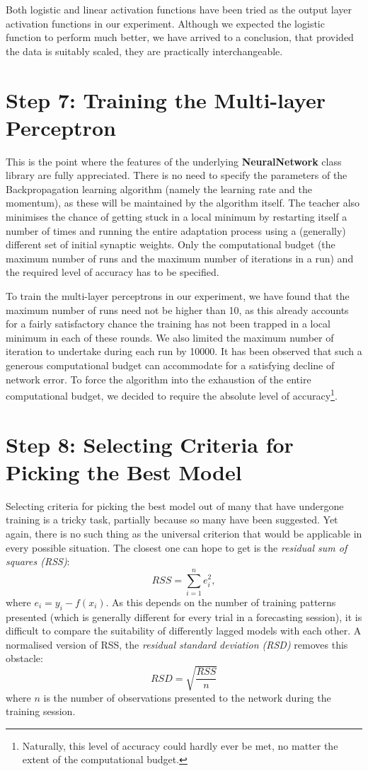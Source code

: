 \smallskip

Both logistic and linear activation functions have been tried as the output layer activation functions in our experiment. Although we expected the logistic function to perform much better, we have arrived to a conclusion, that provided the data is suitably scaled, they are practically interchangeable.

\section{Step 7: Training the Multi-layer Perceptron}

This is the point where the features of the underlying \textbf{NeuralNetwork} class library are fully appreciated. There is no need to specify the parameters of the Backpropagation learning algorithm (namely the learning rate and the momentum), as these will be maintained by the algorithm itself. The teacher also minimises the chance of getting stuck in a local minimum by restarting itself a number of times and running the entire adaptation process using a (generally) different set of initial synaptic weights. Only the computational budget (the maximum number of runs and the maximum number of iterations in a run) and the required level of accuracy has to be specified.

\smallskip

To train the multi-layer perceptrons in our experiment, we have found that the maximum number of runs need not be higher than 10, as this already accounts for a fairly satisfactory chance the training has not been trapped in a local minimum in each of these rounds. We also limited the maximum number of iteration to undertake during each run by 10000. It has been observed that such a generous computational budget can accommodate for a satisfying decline of network error. To force the algorithm into the exhaustion of the entire computational budget, we decided to require the absolute level of accuracy\footnote{Naturally, this level of accuracy could hardly ever be met, no matter the extent of the computational budget.}.

\section{Step 8: Selecting Criteria for Picking the Best Model}

Selecting criteria for picking the best model out of many that have undergone training is a tricky task, partially because so many have been suggested. Yet again, there is no such thing as the universal criterion that would be applicable in every possible situation. The closest one can hope to get is the \textit{residual sum of squares (RSS)}:
$$ RSS = \sum_{i = 1}^{n}{e_i^2}, $$
where $ e_i = y_i - f(x_i) $. As this depends on the number of training patterns presented (which is generally different for every trial in a forecasting session), it is difficult to compare the suitability of differently lagged models with each other. A normalised version of RSS, the \textit{residual standard deviation (RSD)} removes this obstacle:
$$ RSD = \sqrt{\frac{RSS}{n}} $$
where $ n $ is the number of observations presented to the network during the training session.

